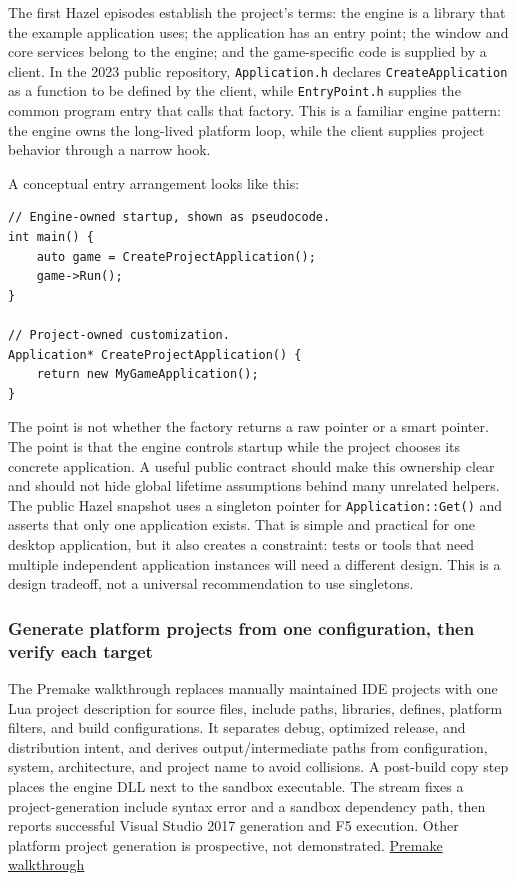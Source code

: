 The first Hazel episodes establish the project's terms: the engine is a library that the example application uses; the application has an entry point; the window and core services belong to the engine; and the game-specific code is supplied by a client. In the 2023 public repository, \texttt{Application.h} declares \texttt{CreateApplication} as a function to be defined by the client, while \texttt{EntryPoint.h} supplies the common program entry that calls that factory. This is a familiar engine pattern: the engine owns the long-lived platform loop, while the client supplies project behavior through a narrow hook.

A conceptual entry arrangement looks like this:

\begin{verbatim}
// Engine-owned startup, shown as pseudocode.
int main() {
    auto game = CreateProjectApplication();
    game->Run();
}

// Project-owned customization.
Application* CreateProjectApplication() {
    return new MyGameApplication();
}
\end{verbatim}

The point is not whether the factory returns a raw pointer or a smart pointer. The point is that the engine controls startup while the project chooses its concrete application. A useful public contract should make this ownership clear and should not hide global lifetime assumptions behind many unrelated helpers. The public Hazel snapshot uses a singleton pointer for \texttt{Application::Get()} and asserts that only one application exists. That is simple and practical for one desktop application, but it also creates a constraint: tests or tools that need multiple independent application instances will need a different design. This is a design tradeoff, not a universal recommendation to use singletons.

\subsubsection{Generate platform projects from one configuration, then verify each target}\label{generate-platform-projects-from-one-configuration-then-verify-each-target}

The Premake walkthrough replaces manually maintained IDE projects with one Lua project description for source files, include paths, libraries, defines, platform filters, and build configurations. It separates debug, optimized release, and distribution intent, and derives output/intermediate paths from configuration, system, architecture, and project name to avoid collisions. A post-build copy step places the engine DLL next to the sandbox executable. The stream fixes a project-generation include syntax error and a sandbox dependency path, then reports successful Visual Studio 2017 generation and F5 execution. Other platform project generation is prospective, not demonstrated. \href{https://www.youtube.com/watch?v=sULV3aB2qeU}{Premake walkthrough}

